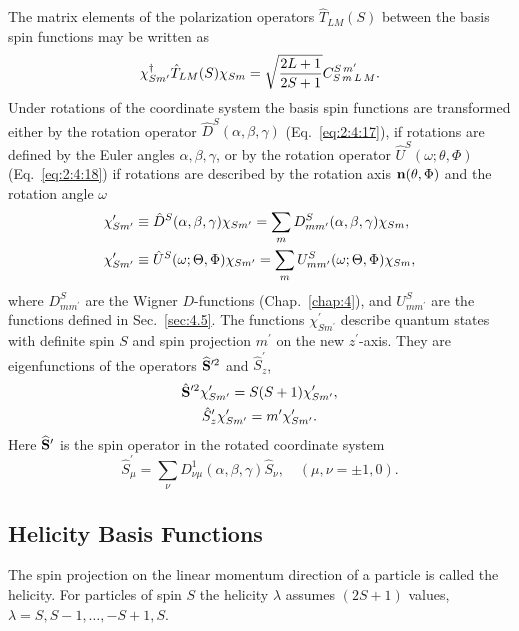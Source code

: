 The matrix elements of the polarization operators $\hat{T}_{L M}(S)$ between the basis spin functions may be written as
\begin{equation}
\chi_{S m^{\prime}}^{\dagger} \hat{T}_{L M}(S) \chi_{S m}=\sqrt{\frac{2 L+1}{2 S+1}} C_{S\,m\,L\,M}^{S\,m^{\prime}}. \label{eq:6:1:15}
\end{equation}
Under rotations of the coordinate system the basis spin functions are transformed either by the rotation operator $\hat{D}^{S}(\alpha, \beta, \gamma)$ (Eq.~\eqref{eq:2:4:17}), if rotations are defined by the Euler angles $\alpha, \beta, \gamma$, or by the rotation operator $\hat{U}^{S}(\omega ; \theta, \Phi)$ (Eq.~\eqref{eq:2:4:18}) if rotations are described by the rotation axis $\mathbf{n}(\theta, \Phi)$ and the rotation angle $\omega$
\begin{align}
& \chi_{S m^{\prime}}^{\prime} \equiv \hat{D}^{S}(\alpha, \beta, \gamma) \chi_{S m^{\prime}}=\sum_{m} D_{m m^{\prime}}^{S}(\alpha, \beta, \gamma) \chi_{S m} , \notag\\
& \chi_{S m^{\prime}}^{\prime} \equiv \hat{U}^{S}(\omega ; \Theta, \Phi) \chi_{S m^{\prime}}=\sum_{m} U_{m m^{\prime}}^{S}(\omega ; \Theta, \Phi) \chi_{S m}, \label{eq:6:1:16}
\end{align}
where $D_{m m^{\prime}}^{S}$ are the Wigner $D$-functions (Chap.~\ref{chap:4}), and $U_{m m^{\prime}}^{S}$ are the functions defined in Sec.~\ref{sec:4.5}. The functions $\chi_{S m^{\prime}}^{\prime}$ describe quantum states with definite spin $S$ and spin projection $m^{\prime}$ on the new $z^{\prime}$-axis. They are eigenfunctions of the operators $\widehat{\mathbf{S}}^{\prime 2}$ and $\widehat{S}_{z}^{\prime}$,
\begin{gather}
\hat{\mathbf{S}}^{\prime 2} \chi_{S m^{\prime}}^{\prime}=S(S+1) \chi_{S m^{\prime}}^{\prime} , \label{eq:6:1:17}\\
\hat{S}_{z}^{\prime} \chi_{S m^{\prime}}^{\prime}=m^{\prime} \chi_{S m^{\prime}}^{\prime} . \notag
\end{gather}
Here $\widehat{\mathbf{S}}^{\prime}$ is the spin operator in the rotated coordinate system
\begin{equation}
\widehat{S}_{\mu}^{\prime}=\sum_{\nu} D_{\nu \mu}^{1}(\alpha, \beta, \gamma) \widehat{S}_{\nu}, \quad(\mu, \nu= \pm 1,0) . \label{eq:6:1:18}
\end{equation}
\subsection{Helicity Basis Functions}\label{sec:6.1.3}
The spin projection on the linear momentum direction of a particle is called the helicity. For particles of spin $S$ the helicity $\lambda$ assumes $(2 S+1)$ values, $\lambda=S, S-1, \ldots,-S+1, S$.

